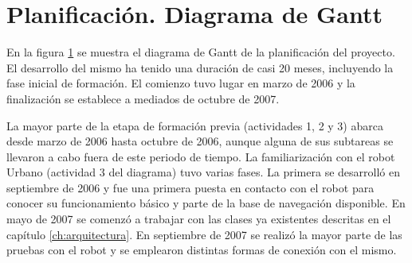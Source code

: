 
\chapter{Planificación. Diagrama de Gantt}\label{gantt}

En la figura \ref{gantt} se muestra el diagrama de Gantt de la planificación del proyecto. El desarrollo del mismo ha tenido una duración de casi 20 meses, incluyendo la fase inicial de formación. El comienzo tuvo lugar en marzo de 2006 y la finalización se establece a mediados de octubre de 2007.

La mayor parte de la etapa de formación previa (actividades 1, 2 y 3) abarca desde marzo de 2006 hasta octubre de 2006, aunque alguna de sus subtareas se llevaron a cabo fuera de este periodo de tiempo. La familiarización con el robot Urbano (actividad 3 del diagrama) tuvo varias fases. La primera se desarrolló en septiembre de 2006 y fue una primera puesta en contacto con el robot para conocer su funcionamiento básico y parte de la base de navegación disponible. En mayo de 2007 se comenzó a trabajar con las clases ya existentes descritas en el capítulo \ref{ch:arquitectura}. En septiembre de 2007 se realizó la mayor parte de las pruebas con el robot y se emplearon distintas formas de conexión con el mismo.

